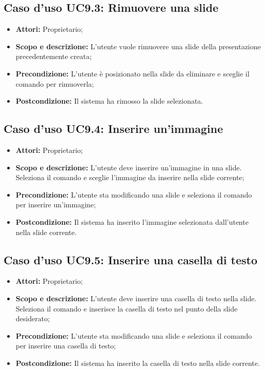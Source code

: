 \subsection{Caso d'uso UC9.3: Rimuovere una \gls{slide}}
\begin{itemize}
	\item \textbf{Attori:} Proprietario;
	\item \textbf{Scopo e descrizione:} L'utente vuole rimuovere una \gls{slide} della presentazione precedentemente creata;
	\item \textbf{Precondizione:} L'utente è posizionato nella \gls{slide} da eliminare e sceglie il comando per rimuoverla;
	\item \textbf{Postcondizione:} Il sistema ha rimosso la \gls{slide} selezionata.
\end{itemize}


\subsection{Caso d'uso UC9.4: Inserire un'immagine}
\begin{itemize}
\item \textbf{Attori:} Proprietario;
\item \textbf{Scopo e descrizione:} L'utente deve inserire un'immagine in una \gls{slide}. Seleziona il comando e sceglie l'immagine da inserire nella \gls{slide} corrente;
\item \textbf{Precondizione:} L'utente sta modificando una \gls{slide} e seleziona il comando per inserire un'immagine;
\item \textbf{Postcondizione:} Il sistema ha inserito l'immagine selezionata dall'utente nella \gls{slide} corrente.
\end{itemize}


\subsection{Caso d'uso UC9.5: Inserire una casella di testo}
\begin{itemize}
\item \textbf{Attori:} Proprietario;
\item \textbf{Scopo e descrizione:} L'utente deve inserire una casella di testo nella \gls{slide}. Seleziona il comando e inserisce la casella di testo nel punto della \gls{slide} desiderato;
\item \textbf{Precondizione:} L'utente sta modificando una \gls{slide} e seleziona il comando per inserire una casella di testo;
\item \textbf{Postcondizione:} Il sistema ha inserito la casella di testo nella \gls{slide} corrente.
\end{itemize}


